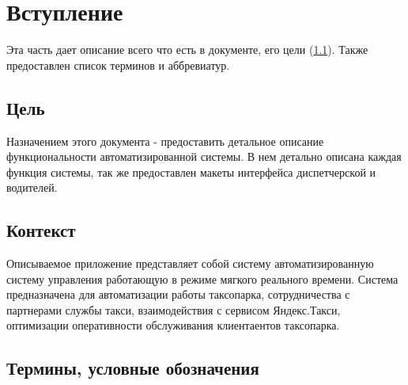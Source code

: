 \chapter{Вступление}

		Эта часть дает описание всего что есть в документе, его цели (\ref{goals}). Также предоставлен список терминов и аббревиатур. 

		\section{Цель}\label{goals}

			Назначением этого документа - предоставить детальное описание функциональности автоматизированной системы. В нем детально описана каждая функция системы, так же предоставлен макеты интерфейса диспетчерской и водителей.

		\section{Контекст}

			Описываемое приложение представляет собой систему автоматизированную систему управления работающую в режиме мягкого реального времени. Система предназначена для автоматизации работы таксопарка, сотрудничества с партнерами службы такси, взаимодействия с сервисом Яндекс.Такси, оптимизации оперативности обслуживания клиентаентов таксопарка.

		\section{Термины, условные обозначения}


